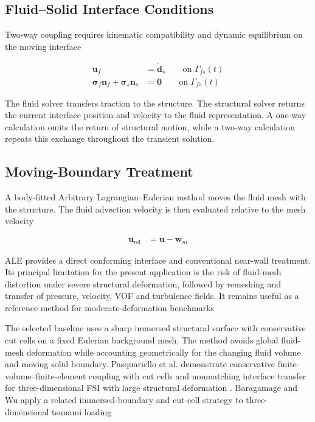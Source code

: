 \subsection{Fluid--Solid Interface Conditions}
\label{subsec:res_str_fsi_interface_conditions}

Two-way coupling requires kinematic compatibility and dynamic equilibrium on the moving interface

\begin{align}
\bm{u}_{f}
&=
\dot{\bm{d}}_{s}
\qquad
\text{on }\Gamma_{fs}(t)
\label{eq:res_str_fsi_kinematic_condition}
\\
\bm{\sigma}_{f}\bm{n}_{f}
+
\bm{\sigma}_{s}\bm{n}_{s}
&=
\bm{0}
\qquad
\text{on }\Gamma_{fs}(t)
\label{eq:res_str_fsi_dynamic_condition}
\end{align}

The fluid solver transfers traction to the structure. The structural solver returns the current interface position and velocity to the fluid representation. A one-way calculation omits the return of structural motion, while a two-way calculation repeats this exchange throughout the transient solution.

\subsection{Moving-Boundary Treatment}
\label{subsec:res_str_fsi_moving_boundary_treatment}

A body-fitted Arbitrary Lagrangian--Eulerian method moves the fluid mesh with the structure. The fluid advection velocity is then evaluated relative to the mesh velocity

\begin{align}
\bm{u}_{\mathrm{rel}}
&=
\bm{u}
-
\bm{w}_{m}
\label{eq:res_str_fsi_ale_relative_velocity}
\end{align}

ALE provides a direct conforming interface and conventional near-wall treatment. Its principal limitation for the present application is the risk of fluid-mesh distortion under severe structural deformation, followed by remeshing and transfer of pressure, velocity, VOF and turbulence fields. It remains useful as a reference method for moderate-deformation benchmarks \autocite{girfoglio2021}

The selected baseline uses a sharp immersed structural surface with conservative cut cells on a fixed Eulerian background mesh. The method avoids global fluid-mesh deformation while accounting geometrically for the changing fluid volume and moving solid boundary. Pasquariello et al. demonstrate conservative finite-volume--finite-element coupling with cut cells and nonmatching interface transfer for three-dimensional FSI with large structural deformation \autocite{pasquariello2016}. Baragamage and Wu apply a related immersed-boundary and cut-cell strategy to three-dimensional tsunami loading \autocite{baragamage2024}

